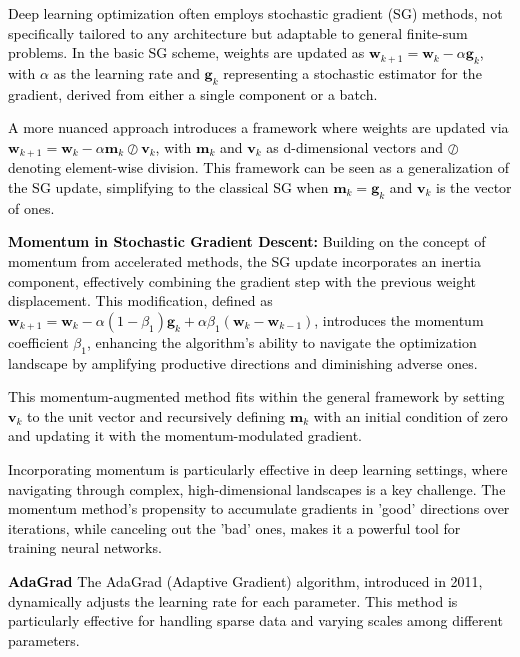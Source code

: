 \documentclass[a4paper,6pt]{extarticle}
\newcommand{\mybox}[2]{
    \begin{tcolorbox}[colback=color!5!white, colframe=color!75!black, boxsep=2pt, top=1pt, bottom=1pt, left=2pt, right=2pt, arc=3pt, outer arc=3pt, title={\textbf{#1}}]
    {\fontsize{5pt}{5pt}\selectfont \textcolor{black}{#2}}
    \end{tcolorbox}
}
\begin{document}
\begin{multicols}{2}
\mybox{SGD for Deep Learning}{

Deep learning optimization often employs stochastic gradient (SG) methods, not specifically tailored to any architecture but adaptable to general finite-sum problems. In the basic SG scheme, weights are updated as \(\boldsymbol{w}_{k+1} = \boldsymbol{w}_k - \alpha \boldsymbol{g}_k\), with \(\alpha\) as the learning rate and \(\boldsymbol{g}_k\) representing a stochastic estimator for the gradient, derived from either a single component or a batch.

A more nuanced approach introduces a framework where weights are updated via \(\boldsymbol{w}_{k+1} = \boldsymbol{w}_k - \alpha \boldsymbol{m}_k \oslash \boldsymbol{v}_k\), with \(\boldsymbol{m}_k\) and \(\boldsymbol{v}_k\) as d-dimensional vectors and \(\oslash\) denoting element-wise division. This framework can be seen as a generalization of the SG update, simplifying to the classical SG when \(\boldsymbol{m}_k = \boldsymbol{g}_k\) and \(\boldsymbol{v}_k\) is the vector of ones.

\textbf{Momentum in Stochastic Gradient Descent:}
Building on the concept of momentum from accelerated methods, the SG update incorporates an inertia component, effectively combining the gradient step with the previous weight displacement. This modification, defined as \(\boldsymbol{w}_{k+1} = \boldsymbol{w}_k - \alpha (1 - \beta_1) \boldsymbol{g}_k + \alpha \beta_1 (\boldsymbol{w}_k - \boldsymbol{w}_{k-1})\), introduces the momentum coefficient \(\beta_1\), enhancing the algorithm's ability to navigate the optimization landscape by amplifying productive directions and diminishing adverse ones.

This momentum-augmented method fits within the general framework by setting \(\boldsymbol{v}_k\) to the unit vector and recursively defining \(\boldsymbol{m}_k\) with an initial condition of zero and updating it with the momentum-modulated gradient.

Incorporating momentum is particularly effective in deep learning settings, where navigating through complex, high-dimensional landscapes is a key challenge. The momentum method's propensity to accumulate gradients in 'good' directions over iterations, while canceling out the 'bad' ones, makes it a powerful tool for training neural networks.

\textbf{AdaGrad}
The AdaGrad (Adaptive Gradient) algorithm, introduced in 2011, dynamically adjusts the learning rate for each parameter. This method is particularly effective for handling sparse data and varying scales among different parameters.

}
\end{multicols}
\end{document}

